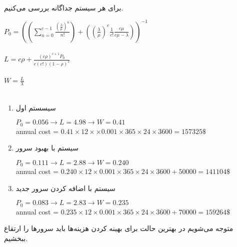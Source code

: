 \\
برای هر سیستم جداگانه بررسی می‌کنیم. \\
\begin{latin}
  \noindent
  $P_0 = ((\sum_{n=0}^{c-1}\frac{(\frac{\lambda}{\mu})^n}{n!})+((\frac{\lambda}{\mu})^c\frac{1}{c!}\frac{c\mu}{c\mu-\lambda}))^{-1}$ \\
  \\
  $L = c\rho + \frac{(c\rho)^{c+1}P_0}{c(c!)(1-\rho)^2}$
  \\\\
  $W = \frac{L}{\lambda}$
  \\ \\
\end{latin}
\begin{enumerate}
  \item سیسستم اول
  \begin{latin}
    $P_0 = 0.056 \rightarrow L = 4.98\rightarrow W = 0.41$ \\
    annual cost = $0.41 \times 12 \times \times 0.001 \times 365 \times 24 \times 3600 = 157325\$$
  \end{latin}
  \item سیستم با بهبود سرور 
  \begin{latin}
    $P_0 = 0.111 \rightarrow L = 2.88\rightarrow W = 0.240$\\
    annual cost = $0.240 \times 12 \times 0.001 \times 365 \times 24 \times 3600 + 50000= 141104\$$
  \end{latin}
  \item سیستم با اضافه کردن سرور جدید
  \begin{latin}
    $P_0 = 0.083 \rightarrow L = 2.83 \rightarrow W = 0.235$\\
    annual cost = $0.235 \times 12 \times 0.001 \times 365 \times 24 \times 3600 + 70000=159264\$$
  \end{latin}
\end{enumerate}
متوجه می‌شویم در بهترین حالت برای بهینه کردن هزینه‌ها باید سرورها را ارتقاع ببخشیم.
\\